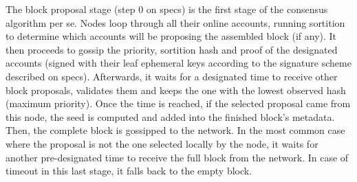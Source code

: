 \documentclass[10pt,a4paper]{article}
\begin{document}








The block proposal stage (step 0 on specs) is the first stage of the 
consensus algorithm per se. Nodes loop through all their online accounts, 
running sortition to determine which accounts will be proposing the 
assembled block (if any).
It then proceeds to gossip the priority, sortition hash and proof of 
the designated accounts (signed with their leaf ephemeral keys according 
to the signature scheme described on specs).
Afterwards, it waits for a designated time to receive other block proposals, 
validates them and keeps the one with the lowest observed hash (maximum 
priority).
Once the time is reached, if the selected proposal came from this node, 
the seed is computed and added into the finished block's metadata. 
Then, the complete block is gossipped to the network.
In the most common case where the proposal is not the one selected 
locally by the node, it waits for another pre-designated time to 
receive the full block from the network.
In case of timeout in this last stage, it falls back to the empty block.
\end{document}

